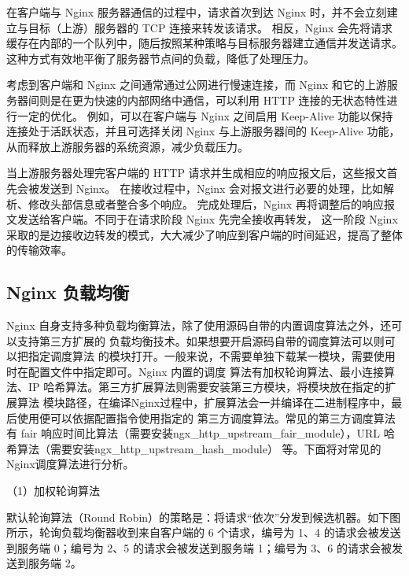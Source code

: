 在客户端与 Nginx 服务器通信的过程中，请求首次到达 Nginx 时，并不会立刻建立与目标（上游）服务器的 TCP 连接来转发该请求。
相反，Nginx 会先将请求缓存在内部的一个队列中，随后按照某种策略与目标服务器建立通信并发送请求。
这种方式有效地平衡了服务器节点间的负载，降低了处理压力。

考虑到客户端和 Nginx 之间通常通过公网进行慢速连接，而 Nginx 和它的上游服务器间则是在更为快速的内部网络中通信，可以利用 HTTP 连接的无状态特性进行一定的优化。
例如，可以在客户端与 Nginx 之间启用 Keep-Alive 功能以保持连接处于活跃状态，并且可选择关闭 Nginx 与上游服务器间的 Keep-Alive 功能，从而释放上游服务器的系统资源，减少负载压力。

当上游服务器处理完客户端的 HTTP 请求并生成相应的响应报文后，这些报文首先会被发送到 Nginx。
在接收过程中，Nginx 会对报文进行必要的处理，比如解析、修改头部信息或者整合多个响应。
完成处理后，Nginx 再将调整后的响应报文发送给客户端。不同于在请求阶段 Nginx 先完全接收再转发，
这一阶段 Nginx 采取的是边接收边转发的模式，大大减少了响应到客户端的时间延迟\cite{邓仲举2012高可靠性集群部署的设计与实现}，提高了整体的传输效率。

\subsection{Nginx 负载均衡}

Nginx 自身支持多种负载均衡算法，除了使用源码自带的内置调度算法之外，还可以支持第三方扩展的
负载均衡技术\cite{sufiev2016dynamic}。如果想要开启源码自带的调度算法可以则可以把指定调度算法
的模块打开。一般来说，不需要单独下载某一模块，需要使用时在配置文件中指定即可。Nginx 内置的调度
算法有加权轮询算法、最小连接算法、IP 哈希算法。第三方扩展算法则需要安装第三方模块，将模块放在指定的扩展算法
模块路径，在编译Nginx过程中，扩展算法会一并编译在二进制程序中，最后使用便可以依据配置指令使用指定的
第三方调度算法。常见的第三方调度算法有 fair 响应时间比算法（需要安装ngx\_http\_upstream\_fair\_module），URL 哈希算法（需要安装ngx\_http\_upstream\_hash\_module）
等。下面将对常见的Nginx调度算法进行分析。

（1）加权轮询算法

默认轮询算法（Round Robin）的策略是：将请求“依次”分发到候选机器。如下图所示，轮询负载均衡器收到来自客户端的 6 个请求，编号为 1、4 的请求会被发送到服务端 0；编号为 2、5 的请求会被发送到服务端 1；编号为 3、6 的请求会被发送到服务端 2。

